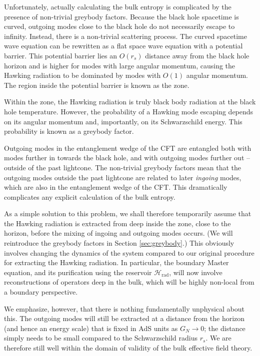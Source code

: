 \documentclass[12pt]{article}
\begin{document}
Unfortunately, actually calculating the bulk entropy is complicated by the presence of non-trivial greybody factors. Because the black hole spacetime is curved, outgoing modes close to the black hole do not necessarily escape to infinity. Instead, there is a non-trivial scattering process. The curved spacetime wave equation can be rewritten as a flat space wave equation with a potential barrier. This potential barrier lies an $O(r_s)$ distance away from the black hole horizon and is higher for modes with large angular momentum, causing the Hawking radiation to be dominated by modes with $O(1)$ angular momentum. The region inside the potential barrier is known as the zone.

Within the zone, the Hawking radiation is truly black body radiation at the black hole temperature. However, the probability of a Hawking mode escaping depends on its angular momentum and, importantly, on its Schwarzschild energy. This probability is known as a greybody factor. 

Outgoing modes in the entanglement wedge of the CFT are entangled both with modes further in towards the black hole, and with outgoing modes further out -- outside of the past lightcone. The non-trivial greybody factors mean that the outgoing modes outside the past lightcone are related to later \emph{ingoing} modes, which are also in the entanglement wedge of the CFT. This dramatically complicates any explicit calculation of the bulk entropy.

As a simple solution to this problem, we shall therefore temporarily assume that the Hawking radiation is extracted from deep inside the zone, close to the horizon, before the mixing of ingoing and outgoing modes occurs. (We will reintroduce the greybody factors in Section \ref{sec:greybody}.) This obviously involves changing the dynamics of the system compared to our original procedure for extracting the Hawking radiation. In particular, the boundary Master equation, and its purification using the reservoir $\mathcal{H}_\text{rad}$, will now involve reconstructions of operators deep in the bulk, which will be highly non-local from a boundary perspective. 

We emphasize, however, that there is nothing fundamentally unphysical about this. The outgoing modes will still be extracted at a distance from the horizon (and hence an energy scale) that is fixed in AdS units as $G_N \to 0$; the distance simply needs to be small compared to the Schwarzschild radius $r_s$. We are therefore still well within the domain of validity of the bulk effective field theory.
\end{document}
